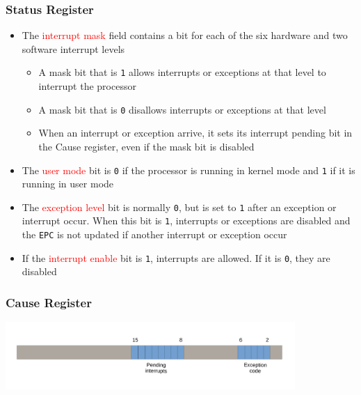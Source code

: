 \documentclass{beamer}
\begin{document}
\begin{frame}%
\frametitle{Status Register}

\scriptsize

\begin{itemize}

\item The \textcolor{red}{interrupt mask} field contains a bit for each
  of the six hardware and two software interrupt levels
  \begin{itemize}
    \scriptsize
  \item A mask bit that is \texttt{1} allows interrupts or exceptions at that level to interrupt the processor
  \item A mask bit that is \texttt{0} disallows interrupts or exceptions at that level
  \item When an interrupt or exception arrive, it sets its interrupt pending bit in the Cause register, even if the mask bit is disabled
  \end{itemize}

\vspace{0.2cm}

\item The \textcolor{red}{user mode} bit is \texttt{0} if the processor is running in kernel mode and \texttt{1} if it is
  running in user mode

  \vspace{0.2cm}

\item The \textcolor{red}{exception level} bit is normally \texttt{0}, but is set to
\texttt{1} after an exception or interrupt occur. When this bit is \texttt{1}, interrupts or exceptions are disabled and the
\texttt{EPC} is not updated if another interrupt or exception occur

\vspace{0.2cm}

\item If the \textcolor{red}{interrupt enable} bit is \texttt{1}, interrupts are
allowed. If it is \texttt{0}, they are disabled

\end{itemize}

\end{frame}

\begin{frame}%
\frametitle{Cause Register}

\begin{center}
  \includegraphics[width=11cm]{cause_register.pdf}
\end{center}

\end{frame}
\end{document}
